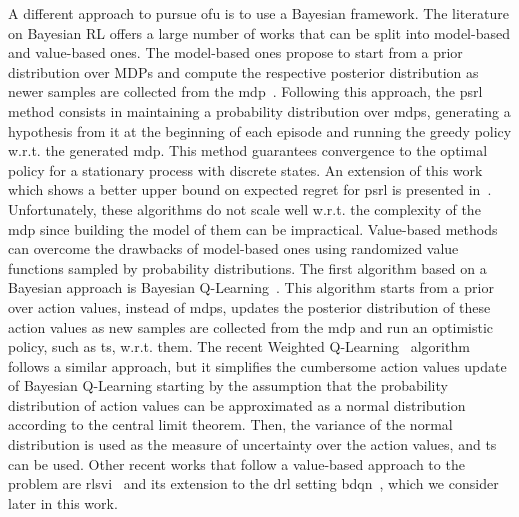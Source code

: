A different approach to pursue \gls{ofu} is to use a Bayesian framework. The literature on Bayesian RL offers a large number of works that can be split into model-based and value-based ones. The model-based ones propose to start from a prior distribution over MDPs and compute the respective posterior distribution as newer samples are collected from the \gls{mdp}~\cite{dearden1999model, kolter2009near}. Following this approach, the \gls{psrl}~\cite{strens2000bayesian} method consists in maintaining a probability distribution over \glspl{mdp}, generating a hypothesis from it at the beginning of each episode and running the greedy policy w.r.t. the generated \gls{mdp}. This method guarantees convergence to the optimal policy for a stationary process with discrete states. An extension of this work which shows a better upper bound on expected regret for \gls{psrl} is presented in~\cite{osband2013more}. Unfortunately, these algorithms do not scale well w.r.t. the complexity of the \gls{mdp} since building the model of them can be impractical.
Value-based methods can overcome the drawbacks of model-based ones using randomized value functions sampled by probability distributions. The first algorithm based on a Bayesian approach is Bayesian Q-Learning~\cite{dearden1998bayesian}. This algorithm starts from a prior over action values, instead of \glspl{mdp}, updates the posterior distribution of these action values as new samples are collected from the \gls{mdp} and run an optimistic policy, such as \gls{ts}, w.r.t. them. The recent Weighted Q-Learning~\cite{deramo2016estimating} algorithm follows a similar approach, but it simplifies the cumbersome action values update of Bayesian Q-Learning starting by the assumption that the probability distribution of action values can be approximated as a normal distribution according to the central limit theorem. Then, the variance of the normal distribution is used as the measure of uncertainty over the action values, and \gls{ts} can be used. 
Other recent works that follow a value-based approach to the problem are \gls{rlsvi}~\cite{osband2016generalization} and its extension to the \gls{drl} setting \gls{bdqn}~\cite{osband2017deep}, which we consider later in this work.


